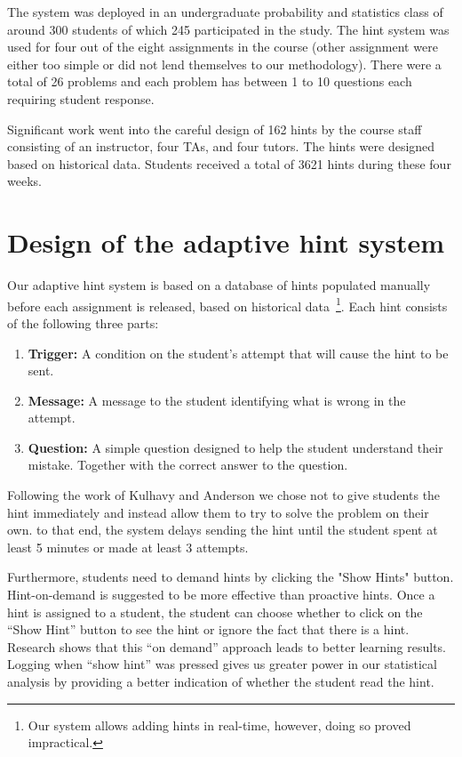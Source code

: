 \documentclass{llncs2e/llncs}
\begin{document}
The system was deployed in an undergraduate probability and statistics class of around 300 students of which 245 participated in the study. The hint system was used for four out of the eight assignments in the course (other assignment were either too simple or did not lend themselves to our methodology). There were a total of 26 problems and each problem has between 1 to 10 questions each requiring student response.

Significant work went into the careful design of 162 hints by the course staff consisting of an instructor, four TAs, and four tutors. The hints were designed based on historical data. Students received a total of 3621 hints during these four weeks.

\section{Design of the adaptive hint system}

Our adaptive hint system is based on a database of hints populated manually before each assignment is released, based on historical data~\footnote{Our system allows adding hints in real-time, however, doing so proved impractical.}. Each hint consists of the following three parts:
\begin{enumerate}
\item {\bf Trigger:} A condition on the student's attempt that will cause the hint to be sent.
\item {\bf Message:} A message to the student identifying what is wrong in the attempt.
\item {\bf Question:} A simple question designed to help the student understand their mistake. Together with the correct answer to the question.   
\end{enumerate}


Following the work of Kulhavy and Anderson\cite{Kulhavy1972} we chose not to give students the hint immediately and instead allow them to try to solve the problem on their own. to that end, the system delays sending the hint until the student spent at least 5 minutes or made at least 3 attempts.

Furthermore, students need to demand hints by clicking the "Show Hints" button. Hint-on-demand is suggested to be more effective than proactive hints\cite{Razzaq2010}. Once a hint is assigned to a student, the student can choose whether to click on the ``Show Hint'' button to see the hint or ignore the fact that there is a hint. Research shows that this ``on demand'' approach leads to better learning results. Logging when ``show hint'' was pressed gives us greater power in our statistical analysis by providing a better indication of whether the student read the hint.
\end{document}
